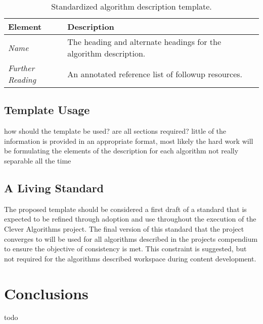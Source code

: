 \documentclass[a4paper, 11pt]{article}
\begin{document}
\begin{table}[ht]
	\centering
		\begin{tabularx}{\textwidth}{lX}
		\toprule
		\textbf{Element} & \textbf{Description} \\ 
		\toprule
		\emph{Name} & The heading and alternate headings for the algorithm description.  \\ 
		\midrule
		\emph{Further Reading} & An annotated reference list of followup resources. \\
		\bottomrule
		\end{tabularx}	
	\caption{Standardized algorithm description template.}
	\label{tab:template}
\end{table}

\subsection{Template Usage}
how should the template be used? are all sections required? little of the information is provided in an appropriate format, most likely the hard work will be formulating the elements of the description for each algorithm
not really separable all the time

\subsection{A Living Standard}
The proposed template should be considered a first draft of a standard that is expected to be refined through adoption and use throughout the execution of the Clever Algorithms project. The final version of this standard that the project converges to will be used for all algorithms described in the projects compendium to ensure the objective of consistency is met. This constraint is suggested, but not required for the algorithms described workspace during content development.

\section{Conclusions}
\label{sec:conclusions}
todo



\end{document}
